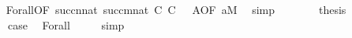 \begin{isabellebody}
\ \ \ \ \ \ \isamarkupfalse%
\ Forall{\isacharparenleft}{\kern0pt}{}{\isacharparenright}{\kern0pt}{\isacharbrackleft}{\kern0pt}OF\ {\isacartoucheopen}succ{\isacharparenleft}{\kern0pt}n{\isacharparenright}{\kern0pt}{\isasymin}nat{\isacartoucheclose}\ {\isacartoucheopen}succ{\isacharparenleft}{\kern0pt}m{\isacharparenright}{\kern0pt}{\isasymin}nat{\isacartoucheclose}\ C{\isacharparenleft}{\kern0pt}{}{\isacharparenright}{\kern0pt}\ C{\isacharparenleft}{\kern0pt}{}{\isacharparenright}{\kern0pt}\ {}\ {}\ A{\isacharbrackleft}{\kern0pt}OF\ {\isacartoucheopen}a{\isasymin}M{\isacartoucheclose}{\isacharbrackright}{\kern0pt}{\isacharbrackright}{\kern0pt}\ \isamarkupfalse%
\ simp\isanewline
\ \ \ \ \isamarkupfalse%
\ \isamarkupfalse%
\ {\isacharquery}{\kern0pt}thesis\ \isacommand{{\isachardot}{\kern0pt}}\isamarkupfalse%
\isanewline
\ \ \isamarkupfalse%
\isanewline
\ \ \isamarkupfalse%
\ \isamarkupfalse%
\ {\isacharquery}{\kern0pt}case\ \isamarkupfalse%
\ Forall\ {}\ {}\ {}\ \isamarkupfalse%
\ simp\isanewline
{}\isamarkupfalse%
%
\endisatagproof
{\isafoldproof}%
%
\isadelimproof
\isanewline
%
\endisadelimproof
%
\isadelimtheory
\isanewline
%
\endisadelimtheory
%
\isatagtheory
{}\isamarkupfalse%
%
\endisatagtheory
{\isafoldtheory}%
%
\isadelimtheory
%
\endisadelimtheory
%
\end{isabellebody}%
\endinput
